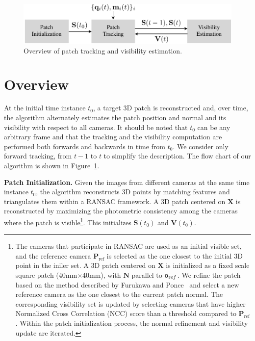 \begin{figure}[t]
	\centering
	\includegraphics[width=0.7\linewidth]{figures/FlowChart}
	\caption{Overview of patch tracking and visibility estimation.}
	\label{fig:overview}
\end{figure}

\section{Overview}
At the initial time instance $t_0$, a target 3D patch is reconstructed and, over time, the algorithm alternately estimates the patch position and normal and its visibility with respect to all cameras. It should be noted that $t_0$ can be any arbitrary frame and that the tracking and the visibility computation are performed both forwards and backwards in time from $t_0$. We consider only forward tracking, from $t-1$ to $t$ to simplify the description. The flow chart of our algorithm is shown in Figure~\ref{fig:overview}.

\noindent \textbf{Patch Initialization.} Given the images from different cameras at the same time instance $t_0$, the algorithm reconstructs 3D points by matching features and triangulates them within a RANSAC framework. A 3D patch centered on $\mathbf{X}$ is reconstructed by maximizing the photometric consistency among the cameras where the patch is visible\footnote{The cameras that participate in RANSAC are used as an initial visible set, and the reference camera $\mathbf{P}_{\textrm{ref}}$ is selected as the one closest to the initial 3D point in the iniler set. A 3D patch centered on $\mathbf{X}$ is initialized as a fixed scale square patch (40mm$\times$40mm), with $\mathbf{N}$ parallel to $\mathbf{o}_{\textrm ref}$. We refine the patch based on the method described by Furukawa and Ponce~\cite{Furukawa2010} and select a new reference camera as the one closest to the current patch normal. The corresponding visibility set is updated by selecting cameras that have higher Normalized Cross Correlation (NCC) score than a threshold compared to $\mathbf{P}_{\textrm{ref}}$. Within the patch initialization process, the normal refinement and visibility update are iterated.}. This initializes $\mathbf{S}(t_0)$ and $\mathbf{V}(t_0)$.

